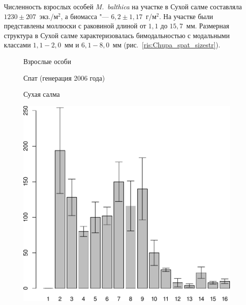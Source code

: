 Численность взрослых особей {\it M.~balthica} на участке в Сухой салме составляла $1230 \pm 207$~экз./м$^2$, а биомасса "--- $6,2 \pm 1,17$~г/м$^2$. 
На участке были представлены моллюски с раковиной длиной от $1,1$ до $15,7$~мм. 
Размерная структура в Сухой салме характеризовалась бимодальностью с модальными классами $1,1 - 2,0$~мм и $6,1 - 8,0$~мм (рис.~\ref{ris:Chupa_spat_sizestr}). 
	\begin{figure}[p]
	\begin{minipage}[b]{.46\linewidth}
	\begin{center}
	Взрослые особи
	\end{center}
	\end{minipage}
	\hfil %
	\begin{minipage}[b]{.46\linewidth}
	\begin{center}
	Спат (генерация 2006 года)
	\end{center}
	\end{minipage}
%
	\begin{minipage}[b]{\linewidth}
	\begin{center}
		Сухая салма
	\end{center}
	\end{minipage}
%
	\begin{minipage}[b]{.46\linewidth}
	\begin{center}
		\includegraphics[width=0.21\textheight]{../White_Sea/spat/adult_str_Suhaya_1.pdf}

\end{center}
\end{minipage}
\end{figure}

